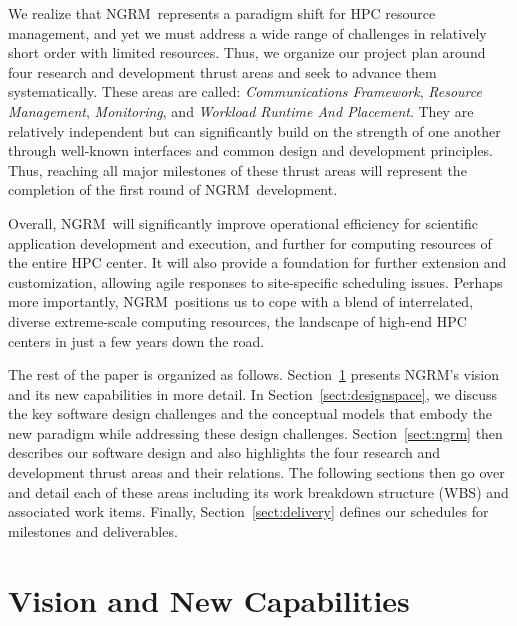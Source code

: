 \documentclass[10pt]{article}
\newif\ifcomments
\newcommand{\ngrm}{NGRM}
\begin{document}
\ifcomments
\marginpar{\tiny {\bf ned-review:}
What about the security model--should it be its own thrust area?  It seems to me
a  robust security model will need to be incorporated from the ground up, so it
should be one of the first things we work on.
{\bf jg:} Security model is developed in comms thrust.}
\fi
We realize that \ngrm\ represents a paradigm shift for HPC resource management, 
and yet we must address a wide range of challenges in relatively short order
with limited resources. Thus, we 
organize our project plan around four research and development thrust areas 
and seek to advance them systematically.
These areas are called:
{\em Communications Framework},
{\em Resource Management},
{\em Monitoring}, and
{\em Workload Runtime And Placement}.
They are relatively independent but can significantly build on the
strength of one another through well-known interfaces and common design
and development principles.
Thus, reaching all major milestones of these thrust areas 
will represent the completion of the first round of \ngrm\ development. 

Overall, \ngrm\ will significantly improve operational efficiency for
scientific application development and execution, and further for computing
resources of the entire HPC center.  It will also provide
a foundation for further extension and customization, allowing agile responses
to site-specific scheduling issues. Perhaps more importantly, \ngrm\
positions us to cope with a blend of interrelated, diverse
extreme-scale computing resources, the landscape of high-end HPC centers
in just a few years down the road.

The rest of the paper is organized as follows.
Section~\ref{sect:vision} presents \ngrm's vision and 
its new capabilities in more detail. 
In Section~\ref{sect:designspace}, we discuss 
the key software design challenges and the conceptual models
that embody the new paradigm while addressing these design challenges. 
Section~\ref{sect:ngrm} then describes our software design
and also highlights the four research and development thrust areas
and their relations. 
The following sections then go over and detail each of these areas including 
its work breakdown structure (WBS) and associated work items.
Finally, Section~\ref{sect:delivery} defines
our schedules for milestones and deliverables.


\section{Vision and New Capabilities}
\label{sect:vision}
\end{document}
